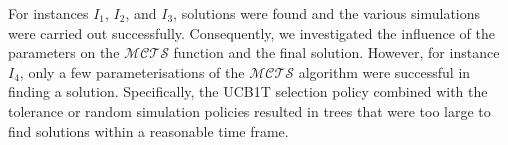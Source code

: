 \begin{table}[h]
    \centering
        \caption{Best results vs State of the art. Solutions were found for instances $I_1$, $I_2$, $I_3$, $I_4$, $I_7$, and $I_8$}

    \label{table:Best result vs state of the art}
\end{table}

For instances $I_1$, $I_2$, and $I_3$, solutions were found and the various simulations were carried out successfully. Consequently, we investigated the influence of the parameters on the $\mathcal{MCTS}$ function and the final solution. However, for instance $I_4$, only a few parameterisations of the $\mathcal{MCTS}$ algorithm were successful in finding a solution. Specifically, the UCB1T selection policy combined with the tolerance or random simulation policies resulted in trees that were too large to find solutions within a reasonable time frame.

